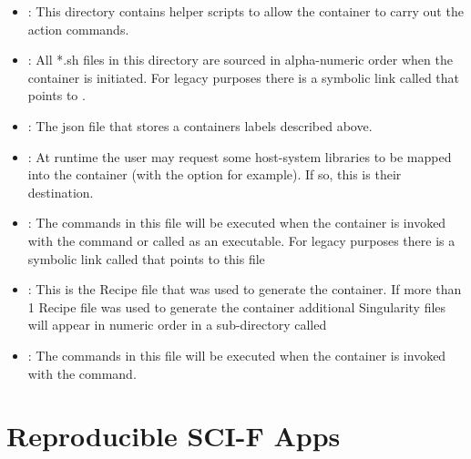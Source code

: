 \documentclass[letterpaper,10pt,english]{sphinxmanual}
\begin{document}
\begin{itemize}
\item {} 
: This directory contains helper scripts to allow the
container to carry out the action commands.

\item {} 
: All *.sh files in this directory are sourced in
alpha-numeric order when the container is initiated. For legacy
purposes there is a symbolic link called  that points to .

\item {} 
: The json file that stores a containers labels
described above.

\item {} 
: At runtime the user may request some host-system libraries
to be mapped into the container (with the  option for example). If so,
this is their destination.

\item {} 
: The commands in this file will be executed when the
container is invoked with the  command or called as an executable. For
legacy purposes there is a symbolic link called  that points to this
file

\item {} 
: This is the Recipe file that was used to generate
the container. If more than 1 Recipe file was used to generate the
container additional Singularity files will appear in numeric order
in a sub-directory called 

\item {} 
: The commands in this file will be executed when the
container is invoked with the  command.

\end{itemize}


\chapter{Reproducible SCI-F Apps}
\label{\detokenize{reproducible_scif_apps:reproducible-sci-f-apps}}\label{\detokenize{reproducible_scif_apps::doc}}
\end{document}
